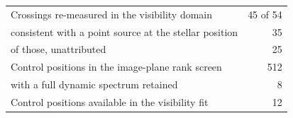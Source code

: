 \begin{tabular}{@{}lr@{}}
\hline
Crossings re-measured in the visibility domain & 45 of 54 \\
\quad consistent with a point source at the stellar position & 35 \\
\quad of those, unattributed & 25 \\
\hline
Control positions in the image-plane rank screen & 512 \\
\quad with a full dynamic spectrum retained & 8 \\
Control positions available in the visibility fit & 12 \\
\hline
\end{tabular}
